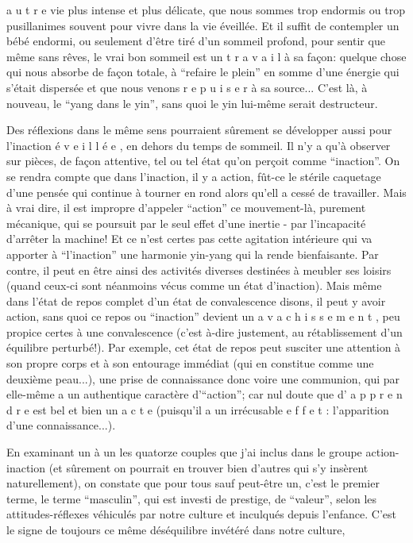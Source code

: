 
a u t r e vie plus intense et plus délicate, que nous sommes trop endormis ou trop pusillanimes souvent pour vivre dans la vie éveillée. Et il suffit de contempler un bébé endormi, ou seulement d'être tiré d'un sommeil profond, pour sentir que même sans rêves, le vrai bon sommeil est un t r a v a i l à sa façon: quelque chose qui nous absorbe de façon totale, à ``refaire le plein'' en somme d'une énergie qui s'était dispersée et que nous venons r e p u i s e r à sa source... C'est là, à nouveau, le ``yang dans le yin'', sans quoi le yin lui-même serait destructeur.

Des réflexions dans le même sens pourraient sûrement se développer aussi pour l'inaction é v e i l l é e , en dehors du temps de sommeil. Il n'y a qu'à observer sur pièces, de façon attentive, tel ou tel état qu'on perçoit comme ``inaction''. On se rendra compte que dans l'inaction, il y a action, fût-ce le stérile caquetage d'une pensée qui continue à tourner en rond alors qu'ell a cessé de travailler. Mais à vrai dire, il est impropre d'appeler ``action'' ce mouvement-là, purement mécanique, qui se poursuit par le seul effet d'une inertie - par l'incapacité d'arrêter la machine! Et ce n'est certes pas cette agitation intérieure qui va apporter à ``l'inaction'' une harmonie yin-yang qui la rende bienfaisante. Par contre, il peut en être ainsi des activités diverses destinées à meubler ses loisirs (quand ceux-ci sont néanmoins vécus comme un état d'inaction). Mais même dans l'état de repos complet d'un état de convalescence disons, il peut y avoir action, sans quoi ce repos ou ``inaction'' devient un a v a c h i s s e m e n t , peu propice certes à une convalescence (c'est à-dire justement, au rétablissement d'un équilibre perturbé!). Par exemple, cet état de repos peut susciter une attention à son propre corps et à son entourage immédiat (qui en constitue comme une deuxième peau...), une prise de connaissance donc voire une communion, qui par elle-même a un authentique caractère d'``action''; car nul doute que d' a p p r e n d r e est bel et bien un a c t e (puisqu'il a un irrécusable e f f e t : l'apparition d'une connaissance...).

En examinant un à un les quatorze couples que j'ai inclus dans le groupe action-inaction (et sûrement on pourrait en trouver bien d'autres qui s'y insèrent naturellement), on constate que pour tous sauf peut-être un, c'est le premier terme, le terme ``masculin'', qui est investi de prestige, de ``valeur'', selon les attitudes-réflexes véhiculés par notre culture et inculqués depuis l'enfance. C'est le signe de toujours ce même déséquilibre invétéré dans notre culture,

